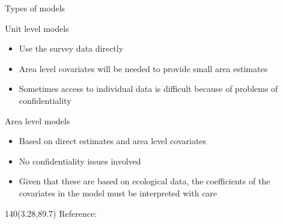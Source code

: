 \begin{frame}{Types of models}
    \begin{block}{Unit level models}
        \begin{itemize}

            \item Use the survey data directly

            \item Area level covariates will be needed to provide small area estimates

            \item Sometimes access to individual data is difficult because of problems
            of confidentiality

        \end{itemize}

        \begin{block}{Area level models}
            \begin{itemize}

                \item Based on direct estimates and area level covariates

                \item No confidentiality issues involved

                \item Given that these are based on ecological data, the coefficients
                of the covariates in the model must be interpreted with care

            \end{itemize}
        \end{block}
    \end{block}
    \setlength{\TPHorizModule}{1mm}
    \setlength{\TPVertModule}{1mm}
    \begin{textblock}{140}(3.28,89.7)
        \tiny{Reference: \cite{Jiang2006a}}
    \end{textblock}
\end{frame}


